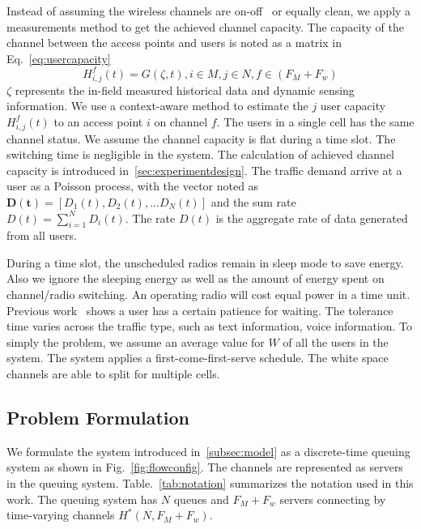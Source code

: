 Instead of assuming the wireless channels are on-off~\cite{bodas2012low} or equally clean, we apply a  
measurements method to get the achieved channel capacity. The capacity of the channel between the access 
points and users is noted as a matrix in Eq.~\ref{eq:usercapacity}
\begin{equation}
\label{eq:usercapacity}
H_{i,j}^f(t)= G(\zeta,t),i \in M, j\in N, f \in (F_M+F_w) 
\end{equation} 
$\zeta$ represents the in-field measured historical data and dynamic sensing information.
We use a context-aware method to estimate the $j$ user capacity $H_{i,j}^f(t)$ to an access point 
$i$ on channel $f$. The users in a single cell has the same channel status. We assume the channel 
capacity is flat during a time slot. The switching time is negligible in the system.
The calculation of achieved channel capacity is introduced in~\ref{sec:experimentdesign}. 
The traffic demand arrive at a user as a Poisson process, with the vector noted as 
$\bm{D(t)} = [D_1(t),D_2(t),...D_N(t)]$ and the sum rate $D(t) = \sum\limits_{i=1}^N D_i(t)$. 
The rate $D(t)$ is the aggregate rate of data generated from all users. 

During a time slot, the unscheduled radios remain in sleep mode to save energy. Also we ignore 
the sleeping energy as well as the amount of energy spent on channel/radio switching. An operating 
radio will cost equal power in a time unit. Previous work~\cite{niida2010user} shows a user has a 
certain patience for waiting. The tolerance time varies across the traffic type, such as text information, 
voice information. To simply the problem, we assume an average value for $W$ of all the users in the system. 
The system applies a first-come-first-serve schedule. The white space channels are able to split for multiple 
cells.

\subsection{Problem Formulation}
\label{subsec:problem}

We formulate the system introduced in~\ref{subsec:model} as a discrete-time queuing system as shown in 
Fig.~\ref{fig:flowconfig}. 
The channels are represented as servers in the queuing system. Table.~\ref{tab:notation} 
summarizes the notation used in this work. The queuing system has $N$ queues and $F_M+F_w$ servers connecting 
by time-varying channels $H^*(N,F_M+F_w)$.


